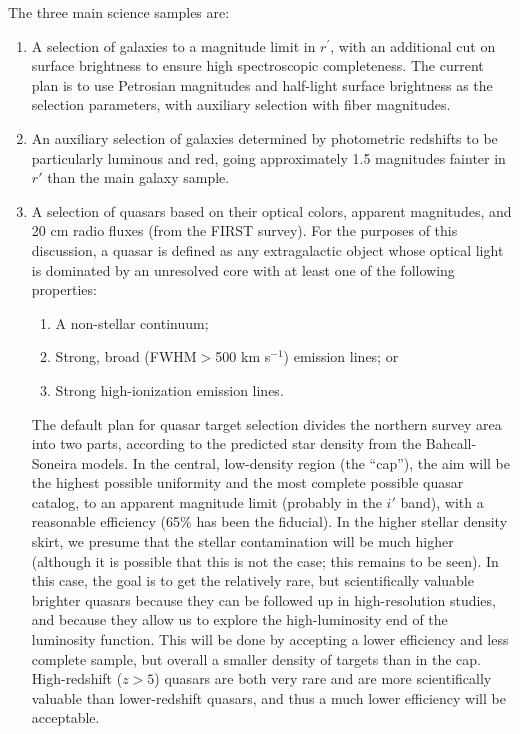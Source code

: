 The three main science samples are:
\begin{enumerate}
\item A selection of galaxies to a magnitude limit in $r^\prime$, with
an additional cut on surface brightness to ensure high spectroscopic
completeness.  The current plan is to use Petrosian magnitudes and half-light
surface brightness as the selection parameters, with auxiliary
selection with fiber magnitudes.
\item  An auxiliary selection of galaxies determined by photometric
redshifts to be particularly luminous and red, going approximately 1.5 magnitudes
fainter in $r'$ than the main galaxy sample. 
\item  A selection of quasars based on their optical colors, 
apparent magnitudes, and 20 cm radio fluxes (from the FIRST survey).  For the
purposes of this discussion, a
quasar is defined as any extragalactic object whose optical light is
dominated by an unresolved core with at least one of the following
properties: 
\begin{enumerate} 
\item A non-stellar continuum;
\item Strong, broad (FWHM${}>{}$500 km s$^{-1}$) emission lines; or
\item Strong high-ionization emission lines. 
\end{enumerate}
The default plan for quasar target selection divides the northern
survey area into two parts, according 
to the predicted star density from the Bahcall-Soneira models.  In the
central, low-density region (the ``cap''), the aim 
will be the highest possible uniformity and the most complete possible
quasar catalog, to an apparent magnitude limit (probably in the $i'$ band),
with a reasonable efficiency (65\% has been the fiducial).  In the
higher stellar density skirt, we presume that the stellar
contamination will be much higher (although it is possible that this
is not the case; this remains to be seen).  In this case, the goal is
to get the relatively rare, 
but scientifically valuable brighter quasars because they can be
followed up in high-resolution studies, and because they allow us to
explore the high-luminosity end of the luminosity function.  This will be done 
by accepting a lower efficiency and less complete sample, but overall
a smaller density of targets than in the cap. 
High-redshift ($z > 5$) quasars are both very rare and are
more scientifically valuable than lower-redshift quasars, and thus a much lower efficiency will be
acceptable.  
\end{enumerate}

